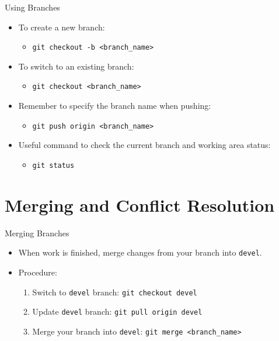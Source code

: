 \begin{frame}{Using Branches}
  \begin{itemize}
    \item To create a new branch:
      \begin{itemize}
        \item \texttt{git checkout -b <branch\_name>}
      \end{itemize}
    \item To switch to an existing branch:
      \begin{itemize}
        \item \texttt{git checkout <branch\_name>}
      \end{itemize}
    \item Remember to specify the branch name when pushing:
      \begin{itemize}
        \item \texttt{git push origin <branch\_name>}
      \end{itemize}
    \item Useful command to check the current branch and working area status:
      \begin{itemize}
        \item \texttt{git status}
      \end{itemize}
  \end{itemize}
\end{frame}

\section{Merging and Conflict Resolution}

\begin{frame}{Merging Branches}
  \begin{itemize}
    \item When work is finished, merge changes from your branch into \texttt{devel}.
    \item Procedure: 
        \begin{enumerate}
            \item Switch to \texttt{devel} branch: \texttt{git checkout devel}
            \item Update \texttt{devel} branch: \texttt{git pull origin devel}
            \item Merge your branch into \texttt{devel}: \texttt{git merge <branch\_name>}
      \end{enumerate}
  \end{itemize}
\end{frame}

